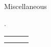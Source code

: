 \divLine

\flushleft \begin{minipage}[t]{\dateColWidth}
Miscellaneous
\end{minipage}
\begin{minipage}[t]{0.8\textwidth}.
	\begin{tabular}{ C{\skillsColWidth} C{\skillsColWidth} C{\skillsColWidth} }
		 &
		 &
		 \\
		 &
	\end{tabular}
\end{minipage}








